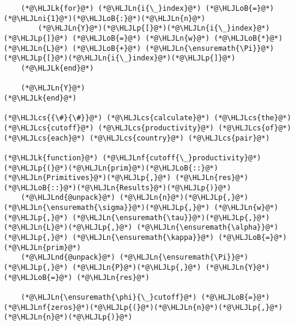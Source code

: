 \documentclass[12pt,a4paper]{article}
\newcommand{\HLJLk}[1]{\textcolor[RGB]{148,91,176}{\textbf{#1}}}
\newcommand{\HLJLn}[1]{#1}
\newcommand{\HLJLnd}[1]{\textcolor[RGB]{214,102,97}{#1}}
\newcommand{\HLJLnf}[1]{\textcolor[RGB]{66,102,213}{#1}}
\newcommand{\HLJLni}[1]{\textcolor[RGB]{59,151,46}{#1}}
\newcommand{\HLJLoB}[1]{\textcolor[RGB]{102,102,102}{\textbf{#1}}}
\newcommand{\HLJLp}[1]{#1}
\newcommand{\HLJLcs}[1]{\textcolor[RGB]{153,153,119}{\textit{#1}}}
\begin{document}
\begin{lstlisting}
    (*@\HLJLk{for}@*) (*@\HLJLn{i{\_}index}@*) (*@\HLJLoB{=}@*) (*@\HLJLni{1}@*)(*@\HLJLoB{:}@*)(*@\HLJLn{n}@*)
        (*@\HLJLn{Y}@*)(*@\HLJLp{[}@*)(*@\HLJLn{i{\_}index}@*)(*@\HLJLp{]}@*) (*@\HLJLoB{=}@*) (*@\HLJLn{w}@*) (*@\HLJLoB{*}@*) (*@\HLJLn{L}@*) (*@\HLJLoB{+}@*) (*@\HLJLn{\ensuremath{\Pi}}@*)(*@\HLJLp{[}@*)(*@\HLJLn{i{\_}index}@*)(*@\HLJLp{]}@*)
    (*@\HLJLk{end}@*)

    (*@\HLJLn{Y}@*)
(*@\HLJLk{end}@*)

(*@\HLJLcs{{\#}{\#}}@*) (*@\HLJLcs{calculate}@*) (*@\HLJLcs{the}@*) (*@\HLJLcs{cutoff}@*) (*@\HLJLcs{productivity}@*) (*@\HLJLcs{of}@*) (*@\HLJLcs{each}@*) (*@\HLJLcs{country}@*) (*@\HLJLcs{pair}@*)

(*@\HLJLk{function}@*) (*@\HLJLnf{cutoff{\_}productivity}@*)(*@\HLJLp{(}@*)(*@\HLJLn{prim}@*)(*@\HLJLoB{::}@*)(*@\HLJLn{Primitives}@*)(*@\HLJLp{,}@*) (*@\HLJLn{res}@*)(*@\HLJLoB{::}@*)(*@\HLJLn{Results}@*)(*@\HLJLp{)}@*)
    (*@\HLJLnd{@unpack}@*) (*@\HLJLn{n}@*)(*@\HLJLp{,}@*) (*@\HLJLn{\ensuremath{\sigma}}@*)(*@\HLJLp{,}@*) (*@\HLJLn{w}@*)(*@\HLJLp{,}@*) (*@\HLJLn{\ensuremath{\tau}}@*)(*@\HLJLp{,}@*) (*@\HLJLn{L}@*)(*@\HLJLp{,}@*) (*@\HLJLn{\ensuremath{\alpha}}@*)(*@\HLJLp{,}@*) (*@\HLJLn{\ensuremath{\kappa}}@*) (*@\HLJLoB{=}@*) (*@\HLJLn{prim}@*)
    (*@\HLJLnd{@unpack}@*) (*@\HLJLn{\ensuremath{\Pi}}@*)(*@\HLJLp{,}@*) (*@\HLJLn{P}@*)(*@\HLJLp{,}@*) (*@\HLJLn{Y}@*) (*@\HLJLoB{=}@*) (*@\HLJLn{res}@*)

    (*@\HLJLn{\ensuremath{\phi}{\_}cutoff}@*) (*@\HLJLoB{=}@*) (*@\HLJLnf{zeros}@*)(*@\HLJLp{(}@*)(*@\HLJLn{n}@*)(*@\HLJLp{,}@*) (*@\HLJLn{n}@*)(*@\HLJLp{)}@*)


\end{lstlisting}
\end{document}
